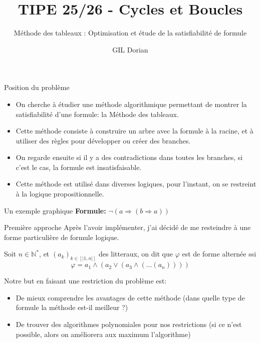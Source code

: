\documentclass[]{beamer}
\title{TIPE 25/26 - Cycles et Boucles}
\author{GIL Dorian}
\subtitle{Méthode des tableaux : Optimisation et étude de la satisfiabilité de formule}
\date{}
\begin{document}
\begin{frame}
\titlepage
\end{frame}

\begin{frame}{Position du problème}
    \begin{itemize}[<+->]
        \item On cherche à étudier une méthode algorithmique permettant de montrer la satisfiabilité d'une formule: la Méthode des tableaux.
        \item Cette méthode consiste à construire un arbre avec la formule à la racine, et à utiliser des règles pour développer ou créer des branches.
        \item On regarde ensuite si il y a des contradictions dans toutes les branches, si c'est le cas, la formule est insatisfaisable.
        \item Cette méthode est utilisé dans diverses logiques, pour l'instant, on se restreint à la logique propositionnelle.
    \end{itemize}
\end{frame}

\begin{frame}{Un exemple graphique}
    \textbf{Formule:} $\lnot(a \Rightarrow (b \Rightarrow a))$

    \begin{center}
    \end{center}
\end{frame}

\begin{frame}{Première approche}
    Après l'avoir implémenter, j'ai décidé de me resteindre à une forme particulière de formule logique.
    \begin{definition}
        Soit $n\in\mathbb{N}^*$, et $(a_k)_{k\in [|1,n|]}$ des litteraux, on dit que $\varphi$ est de forme alternée ssi
        $$\varphi = a_1\land(a_2\lor(a_3\land(\dots(a_n))))$$
    \end{definition}
    Notre but en faisant une restriction du problème est:
    \begin{itemize}
        \item De mieux comprendre les avantages de cette méthode (dans quelle type de formule la méthode est-il meilleur ?)
        \item De trouver des algorithmes polynomiales pour nos restrictions (si ce n'est possible, alors on améliorera aux maximum l'algorithme)
    \end{itemize}
\end{frame}
\end{document}
